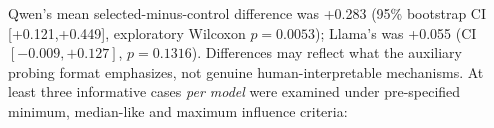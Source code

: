 \documentclass[10pt,a4paper,twocolumn]{article}
\begin{document}
\begin{table}[t]\centering\footnotesize
{}
\caption{Descriptive evidence-selection faithfulness diagnostics; $n=40$, Wilcoxon exploratory.}\label{tab:interp}
\end{table}

Qwen's mean selected-minus-control difference was +0.283 (95\% bootstrap CI [+0.121,+0.449], exploratory Wilcoxon $p=0.0053$); Llama's was +0.055 (CI $[-0.009,+0.127]$, $p=0.1316$). Differences may reflect what the auxiliary probing format emphasizes, not genuine human-interpretable mechanisms. At least three informative cases \emph{per model} were examined under pre-specified minimum, median-like and maximum influence criteria:
\end{document}

